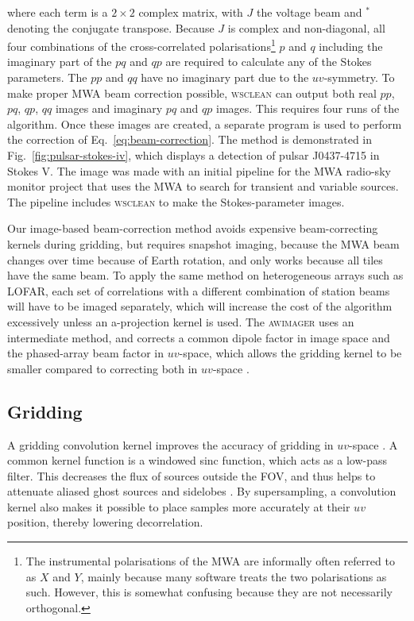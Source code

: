 \documentclass[useAMS,usenatbib]{mn2e}
\begin{document}
where each term is a $2\times2$ complex matrix, with $J$ the voltage beam and $^*$ denoting the conjugate transpose. Because $J$ is complex and non-diagonal, all four combinations of the cross-correlated polarisations\footnote{The instrumental polarisations of the MWA are informally often referred to as $X$ and $Y$, mainly because many software treats the two polarisations as such. However, this is somewhat confusing because they are not necessarily orthogonal.} $p$ and $q$ including the imaginary part of the $pq$ and $qp$ are required to calculate any of the Stokes parameters. The $pp$ and $qq$ have no imaginary part due to the $uv$-symmetry. To make proper MWA beam correction possible, \textsc{wsclean} can output both real $pp$, $pq$, $qp$, $qq$ images and imaginary $pq$ and $qp$ images. This requires four runs of the algorithm. Once these images are created, a separate program is used to perform the correction of Eq.~\eqref{eq:beam-correction}. The method is demonstrated in Fig.~\ref{fig:pulsar-stokes-iv}, which displays a detection of pulsar J0437-4715 in Stokes V. The image was made with an initial pipeline for the MWA radio-sky monitor project that uses the MWA to search for transient and variable sources. The pipeline includes \textsc{wsclean} to make the Stokes-parameter images.

Our image-based beam-correction method avoids expensive beam-correcting kernels during gridding, but requires snapshot imaging, because the MWA beam changes over time because of Earth rotation, and only works because all tiles have the same beam. To apply the same method on heterogeneous arrays such as LOFAR, each set of correlations with a different combination of station beams will have to be imaged separately, which will increase the cost of the algorithm excessively unless an a-projection kernel is used. The \textsc{awimager} uses an intermediate method, and corrects a common dipole factor in image space and the phased-array beam factor in $uv$-space, which allows the gridding kernel to be smaller compared to correcting both in $uv$-space \citep{awimager-2013}.

\subsection{Gridding} \label{sec:gridding}
A gridding convolution kernel improves the accuracy of gridding in $uv$-space \citep{optimal-gridding-schwab-1983}. A common kernel function is a windowed sinc function, which acts as a low-pass filter. This decreases the flux of sources outside the FOV, and thus helps to attenuate aliased ghost sources and sidelobes \citep{post-correlation-filtering}. By supersampling, a convolution kernel also makes it possible to place samples more accurately at their $uv$ position, thereby lowering decorrelation.
\end{document}
